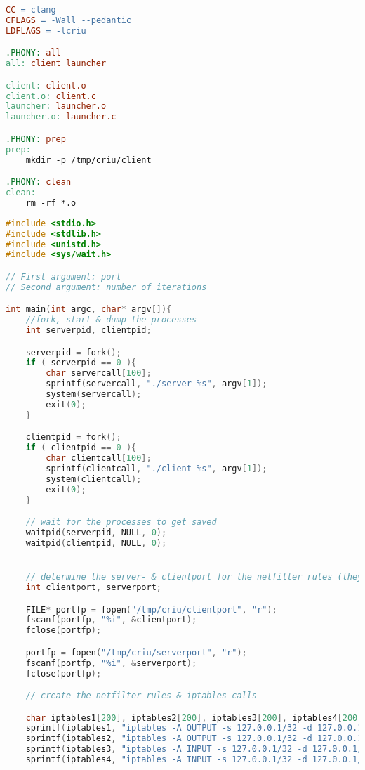 \documentclass[a4paper]{article}
\begin{document}
\begin{lstlisting}[caption=Ohne TCP: Makefile,language=make]
CC = clang
CFLAGS = -Wall --pedantic
LDFLAGS = -lcriu

.PHONY: all
all: client launcher

client: client.o
client.o: client.c
launcher: launcher.o
launcher.o: launcher.c

.PHONY: prep
prep:
	mkdir -p /tmp/criu/client

.PHONY: clean
clean:
	rm -rf *.o
\end{lstlisting}
\clearpage
\newpage

\begin{lstlisting}[caption=Mit TCP: Launcher,language=C]
#include <stdio.h>
#include <stdlib.h>
#include <unistd.h>
#include <sys/wait.h>

// First argument: port
// Second argument: number of iterations

int main(int argc, char* argv[]){
    //fork, start & dump the processes
    int serverpid, clientpid;

    serverpid = fork();
    if ( serverpid == 0 ){
        char servercall[100];
        sprintf(servercall, "./server %s", argv[1]);
        system(servercall);
        exit(0);
    }

    clientpid = fork();
    if ( clientpid == 0 ){
        char clientcall[100];
        sprintf(clientcall, "./client %s", argv[1]);
        system(clientcall);
        exit(0);
    }

    // wait for the processes to get saved
    waitpid(serverpid, NULL, 0);
    waitpid(clientpid, NULL, 0);


    // determine the server- & clientport for the netfilter rules (they are written to a file by the server and client before the dump)
    int clientport, serverport;

    FILE* portfp = fopen("/tmp/criu/clientport", "r");
    fscanf(portfp, "%i", &clientport);
    fclose(portfp);

    portfp = fopen("/tmp/criu/serverport", "r");
    fscanf(portfp, "%i", &serverport);
    fclose(portfp);

    // create the netfilter rules & iptables calls

    char iptables1[200], iptables2[200], iptables3[200], iptables4[200];
    sprintf(iptables1, "iptables -A OUTPUT -s 127.0.0.1/32 -d 127.0.0.1/32 -p tcp -m mark ! --mark 0xc114 -m tcp --sport %i --dport %i -j DROP", clientport, serverport);
    sprintf(iptables2, "iptables -A OUTPUT -s 127.0.0.1/32 -d 127.0.0.1/32 -p tcp -m mark ! --mark 0xc114 -m tcp --sport %i --dport %i -j DROP", serverport, clientport);
    sprintf(iptables3, "iptables -A INPUT -s 127.0.0.1/32 -d 127.0.0.1/32 -p tcp -m mark ! --mark 0xc114 -m tcp --sport %i --dport %i -j DROP", clientport, serverport);
    sprintf(iptables4, "iptables -A INPUT -s 127.0.0.1/32 -d 127.0.0.1/32 -p tcp -m mark ! --mark 0xc114 -m tcp --sport %i --dport %i -j DROP", serverport, clientport);



\end{lstlisting}
\end{document}
